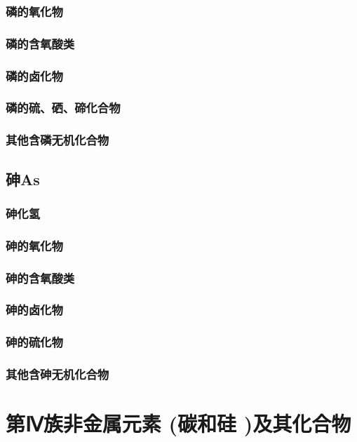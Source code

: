 \documentclass[UTF8]{../03-Chemistry}
\begin{document}
        \subsubsection{磷的氧化物}
        \subsubsection{磷的含氧酸类}
        \subsubsection{磷的卤化物}
        \subsubsection{磷的硫、硒、碲化合物}
        \subsubsection{其他含磷无机化合物}
    \subsection{砷As}
        \subsubsection{砷化氢}
        \subsubsection{砷的氧化物}
        \subsubsection{砷的含氧酸类}
        \subsubsection{砷的卤化物}
        \subsubsection{砷的硫化物}
        \subsubsection{其他含砷无机化合物}
        
\section{第Ⅳ族非金属元素 (碳和硅 )及其化合物}
\end{document}
